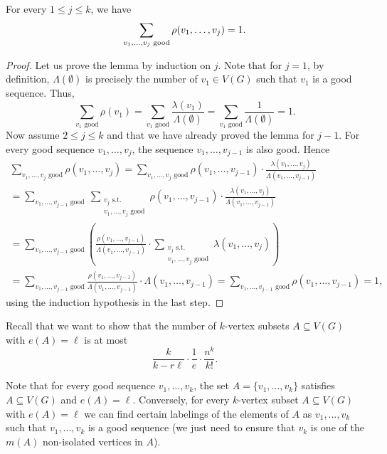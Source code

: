 \begin{lemma}\label{lemma1}For every $1\leq j\leq k$, we have
\[\sum_{v_1,\dots,v_{j} \textnormal { good}}\rho(v_1,\dots,v_j)= 1.\]
\end{lemma}
\begin{proof}
Let us prove the lemma by induction on $j$. Note that for $j=1$, by definition, $\Lambda(\emptyset)$ is precisely the number of $v_1\in V(G)$  such that $v_1$ is a good sequence. Thus, 
\[\sum_{v_1 \text { good}}\rho(v_1)=\sum_{v_1 \text { good}}\frac{\lambda(v_1)}{\Lambda(\emptyset)}=\sum_{v_1 \text { good}}\frac{1}{\Lambda(\emptyset)}=1.\]
Now assume $2\leq j\leq k$ and that we have already proved the lemma for $j-1$. For every good sequence $v_1,\dots,v_{j}$, the sequence $v_1,\dots,v_{j-1}$ is also good. Hence
\begin{multline*}
\sum_{v_1,\dots,v_{j} \text { good}}\rho(v_1,\dots,v_j)=\sum_{v_1,\dots,v_{j} \text { good}}\rho(v_1,\dots,v_{j-1})\cdot  \frac{\lambda(v_1,\dots,v_{j})}{\Lambda(v_1,\dots,v_{j-1})}\\
=\sum_{v_1,\dots,v_{j-1} \text { good}}\ \sum_{\substack{v_j\text{ s.t.\ }\\v_1,\dots,v_{j} \text { good}}} \rho(v_1,\dots,v_{j-1})\cdot  \frac{\lambda(v_1,\dots,v_{j})}{\Lambda(v_1,\dots,v_{j-1})}\\
=\sum_{v_1,\dots,v_{j-1} \text { good}}\left(\frac{\rho(v_1,\dots,v_{j-1})}{\Lambda(v_1,\dots,v_{j-1})}\cdot \sum_{\substack{v_j\text{ s.t.\ }\\v_1,\dots,v_{j} \text { good}}} \lambda(v_1,\dots,v_{j})\right)\\
=\sum_{v_1,\dots,v_{j-1} \text { good}} \frac{\rho(v_1,\dots,v_{j-1})}{\Lambda(v_1,\dots,v_{j-1})}\cdot \Lambda(v_1,\dots,v_{j-1})=\sum_{v_1,\dots,v_{j-1} \text { good}} \rho(v_1,\dots,v_{j-1})=1,
\end{multline*}
using the induction hypothesis in the last step.
\end{proof}

Recall that we want to show that the number of $k$-vertex subsets $A\subseteq V(G)$ with $e(A)=\ell$ is at most
\[\frac{k}{k-r\ell}\cdot \frac{1}{e}\cdot \frac{n^k}{k!}.\]

Note that for every good sequence $v_1,\dots,v_k$, the set $A=\lbrace v_1,\dots,v_k\rbrace$ satisfies $A\subseteq V(G)$ and $e(A)=\ell$.  Conversely, for every $k$-vertex subset $A\subseteq V(G)$ with $e(A)=\ell$ we can find certain labelings of the elements of $A$ as $v_1,\dots, v_k$ such that $v_1,\dots, v_k$ is a good sequence (we just need to ensure that $v_k$ is one of the $m(A)$ non-isolated vertices in $A$).

